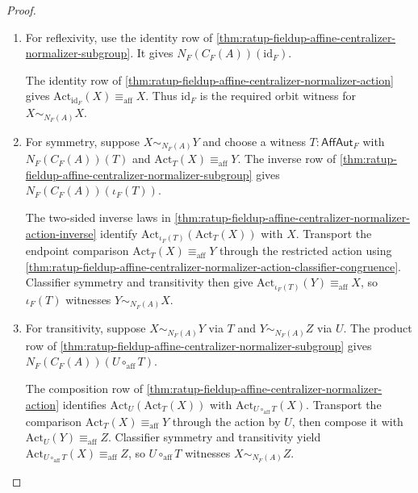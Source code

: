 \begin{proof}
\begin{enumerate}
\item
For reflexivity, use the identity row of
\autoref{thm:ratup-fieldup-affine-centralizer-normalizer-subgroup}. It gives
$N_F(C_F(A))(\mathrm{id}_F)$.

The identity row of
\autoref{thm:ratup-fieldup-affine-centralizer-normalizer-action} gives
$\mathrm{Act}_{\mathrm{id}_F}(X)\equiv_{\mathrm{aff}}X$. Thus
$\mathrm{id}_F$ is the required orbit witness for $X\sim_{N_F(A)}X$.

\item
For symmetry, suppose $X\sim_{N_F(A)}Y$ and choose a witness
$T:\mathsf{AffAut}_F$ with $N_F(C_F(A))(T)$ and
$\mathrm{Act}_T(X)\equiv_{\mathrm{aff}}Y$. The inverse row of
\autoref{thm:ratup-fieldup-affine-centralizer-normalizer-subgroup} gives
$N_F(C_F(A))(\iota_F(T))$.

The two-sided inverse laws in
\autoref{thm:ratup-fieldup-affine-centralizer-normalizer-action-inverse}
identify $\mathrm{Act}_{\iota_F(T)}(\mathrm{Act}_T(X))$ with $X$. Transport
the endpoint comparison
$\mathrm{Act}_T(X)\equiv_{\mathrm{aff}}Y$ through the restricted action using
\autoref{thm:ratup-fieldup-affine-centralizer-normalizer-action-classifier-congruence}.
Classifier symmetry and transitivity then give
$\mathrm{Act}_{\iota_F(T)}(Y)\equiv_{\mathrm{aff}}X$, so
$\iota_F(T)$ witnesses $Y\sim_{N_F(A)}X$.

\item
For transitivity, suppose $X\sim_{N_F(A)}Y$ via $T$ and $Y\sim_{N_F(A)}Z$ via
$U$. The product row of
\autoref{thm:ratup-fieldup-affine-centralizer-normalizer-subgroup} gives
$N_F(C_F(A))(U\circ_{\mathrm{aff}}T)$.

The composition row of
\autoref{thm:ratup-fieldup-affine-centralizer-normalizer-action} identifies
$\mathrm{Act}_U(\mathrm{Act}_T(X))$ with
$\mathrm{Act}_{U\circ_{\mathrm{aff}}T}(X)$. Transport the comparison
$\mathrm{Act}_T(X)\equiv_{\mathrm{aff}}Y$ through the action by $U$, then
compose it with $\mathrm{Act}_U(Y)\equiv_{\mathrm{aff}}Z$. Classifier symmetry
and transitivity yield
$\mathrm{Act}_{U\circ_{\mathrm{aff}}T}(X)\equiv_{\mathrm{aff}}Z$, so
$U\circ_{\mathrm{aff}}T$ witnesses $X\sim_{N_F(A)}Z$.
\end{enumerate}
\end{proof}

